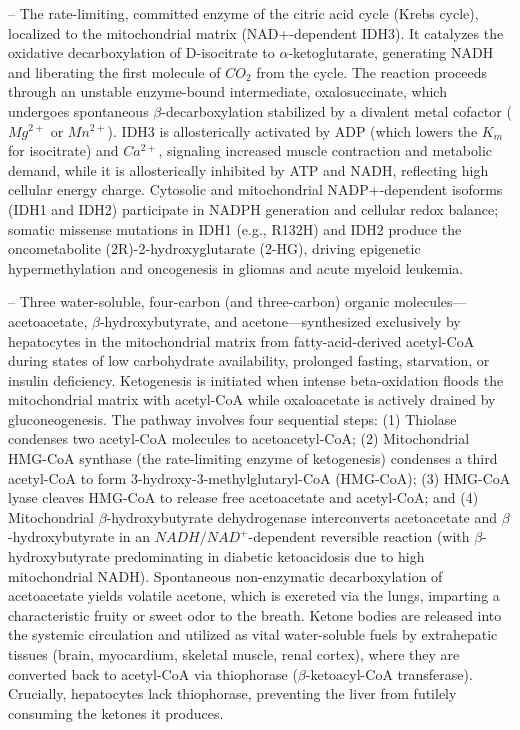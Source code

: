 -- The rate-limiting, committed enzyme of the citric acid cycle (Krebs cycle), localized to the mitochondrial matrix (NAD+-dependent IDH3). It catalyzes the oxidative decarboxylation of D-isocitrate to $\alpha$-ketoglutarate, generating NADH and liberating the first molecule of $CO_2$ from the cycle. The reaction proceeds through an unstable enzyme-bound intermediate, oxalosuccinate, which undergoes spontaneous $\beta$-decarboxylation stabilized by a divalent metal cofactor ($Mg^{2+}$ or $Mn^{2+}$). IDH3 is allosterically activated by ADP (which lowers the $K_m$ for isocitrate) and $Ca^{2+}$, signaling increased muscle contraction and metabolic demand, while it is allosterically inhibited by ATP and NADH, reflecting high cellular energy charge. Cytosolic and mitochondrial NADP+-dependent isoforms (IDH1 and IDH2) participate in NADPH generation and cellular redox balance; somatic missense mutations in IDH1 (e.g., R132H) and IDH2 produce the oncometabolite (2R)-2-hydroxyglutarate (2-HG), driving epigenetic hypermethylation and oncogenesis in gliomas and acute myeloid leukemia.

-- Three water-soluble, four-carbon (and three-carbon) organic molecules---acetoacetate, $\beta$-hydroxybutyrate, and acetone---synthesized exclusively by hepatocytes in the mitochondrial matrix from fatty-acid-derived acetyl-CoA during states of low carbohydrate availability, prolonged fasting, starvation, or insulin deficiency. Ketogenesis is initiated when intense beta-oxidation floods the mitochondrial matrix with acetyl-CoA while oxaloacetate is actively drained by gluconeogenesis. The pathway involves four sequential steps: (1) Thiolase condenses two acetyl-CoA molecules to acetoacetyl-CoA; (2) Mitochondrial HMG-CoA synthase (the rate-limiting enzyme of ketogenesis) condenses a third acetyl-CoA to form 3-hydroxy-3-methylglutaryl-CoA (HMG-CoA); (3) HMG-CoA lyase cleaves HMG-CoA to release free acetoacetate and acetyl-CoA; and (4) Mitochondrial $\beta$-hydroxybutyrate dehydrogenase interconverts acetoacetate and $\beta$-hydroxybutyrate in an $NADH/NAD^+$-dependent reversible reaction (with $\beta$-hydroxybutyrate predominating in diabetic ketoacidosis due to high mitochondrial NADH). Spontaneous non-enzymatic decarboxylation of acetoacetate yields volatile acetone, which is excreted via the lungs, imparting a characteristic fruity or sweet odor to the breath. Ketone bodies are released into the systemic circulation and utilized as vital water-soluble fuels by extrahepatic tissues (brain, myocardium, skeletal muscle, renal cortex), where they are converted back to acetyl-CoA via thiophorase ($\beta$-ketoacyl-CoA transferase). Crucially, hepatocytes lack thiophorase, preventing the liver from futilely consuming the ketones it produces.

